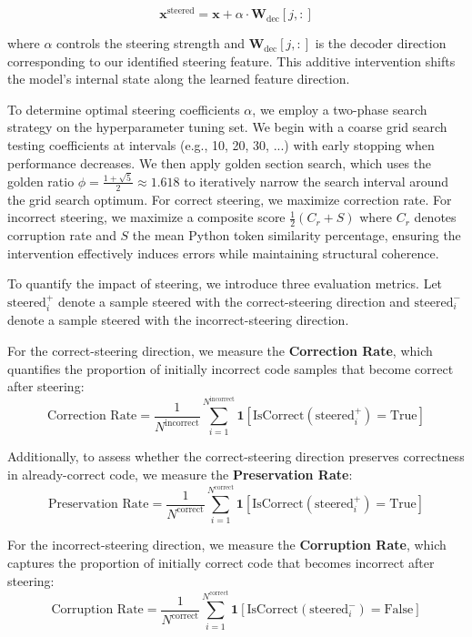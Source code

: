 \begin{equation}
\mathbf{x}^{\text{steered}} = \mathbf{x} + \alpha \cdot \mathbf{W}_{\text{dec}}[j,:]
\end{equation}

where $\alpha$ controls the steering strength and $\mathbf{W}_{\text{dec}}[j,:]$ is the decoder direction corresponding to our identified steering feature. This additive intervention shifts the model's internal state along the learned feature direction.

To determine optimal steering coefficients $\alpha$, we employ a two-phase search strategy on the hyperparameter tuning set. We begin with a coarse grid search testing coefficients at intervals (e.g., 10, 20, 30, ...) with early stopping when performance decreases. We then apply golden section search, which uses the golden ratio $\phi = \frac{1 + \sqrt{5}}{2} \approx 1.618$ to iteratively narrow the search interval around the grid search optimum. For correct steering, we maximize correction rate. For incorrect steering, we maximize a composite score $\frac{1}{2}(C_r + S)$ where $C_r$ denotes corruption rate and $S$ the mean Python token similarity percentage, ensuring the intervention effectively induces errors while maintaining structural coherence.

To quantify the impact of steering, we introduce three evaluation metrics. Let $\text{steered}_i^{+}$ denote a sample steered with the correct-steering direction and $\text{steered}_i^{-}$ denote a sample steered with the incorrect-steering direction.

For the correct-steering direction, we measure the \textbf{Correction Rate}, which quantifies the proportion of initially incorrect code samples that become correct after steering:
\begin{equation}
\text{Correction Rate} = \frac{1}{N^{\text{incorrect}}} \sum_{i=1}^{N^{\text{incorrect}}} \mathbf{1}[\text{IsCorrect}(\text{steered}_i^{+})= \text{True}]
\end{equation}

Additionally, to assess whether the correct-steering direction preserves correctness in already-correct code, we measure the \textbf{Preservation Rate}:
\begin{equation}
\text{Preservation Rate} = \frac{1}{N^{\text{correct}}} \sum_{i=1}^{N^{\text{correct}}} \mathbf{1}[\text{IsCorrect}(\text{steered}_i^{+})= \text{True}]
\end{equation}

For the incorrect-steering direction, we measure the \textbf{Corruption Rate}, which captures the proportion of initially correct code that becomes incorrect after steering:
\begin{equation}
\text{Corruption Rate} = \frac{1}{N^{\text{correct}}} \sum_{i=1}^{N^{\text{correct}}} \mathbf{1}[\text{IsCorrect}(\text{steered}_i^{-})= \text{False}]
\end{equation}

